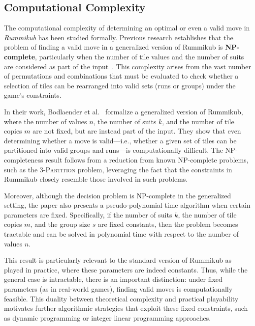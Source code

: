 \documentclass[11pt,letterpaper]{article}
\begin{document}
\subsection*{Computational Complexity}

The computational complexity of determining an optimal or even a valid move in \textit{Rummikub} has been studied formally. Previous research establishes that the problem of finding a valid move in a generalized version of Rummikub is \textbf{NP-complete}, particularly when the number of tile values and the number of suits are considered as part of the input~\cite{rummikub_complexity}. This complexity arises from the vast number of permutations and combinations that must be evaluated to check whether a selection of tiles can be rearranged into valid sets (runs or groups) under the game’s constraints.

In their work, Bodlaender et al.~\cite{rummikub_complexity} formalize a generalized version of Rummikub, where the number of values $n$, the number of suits $k$, and the number of tile copies $m$ are not fixed, but are instead part of the input. They show that even determining whether a move is valid—i.e., whether a given set of tiles can be partitioned into valid groups and runs—is computationally difficult. The NP-completeness result follows from a reduction from known NP-complete problems, such as the \textsc{3-Partition} problem, leveraging the fact that the constraints in Rummikub closely resemble those involved in such problems.

Moreover, although the decision problem is NP-complete in the generalized setting, the paper also presents a pseudo-polynomial time algorithm when certain parameters are fixed. Specifically, if the number of suits $k$, the number of tile copies $m$, and the group size $s$ are fixed constants, then the problem becomes tractable and can be solved in polynomial time with respect to the number of values $n$. 

This result is particularly relevant to the standard version of Rummikub as played in practice, where these parameters are indeed constants. Thus, while the general case is intractable, there is an important distinction: under fixed parameters (as in real-world games), finding valid moves is computationally feasible. This duality between theoretical complexity and practical playability motivates further algorithmic strategies that exploit these fixed constraints, such as dynamic programming or integer linear programming approaches.
\end{document}
